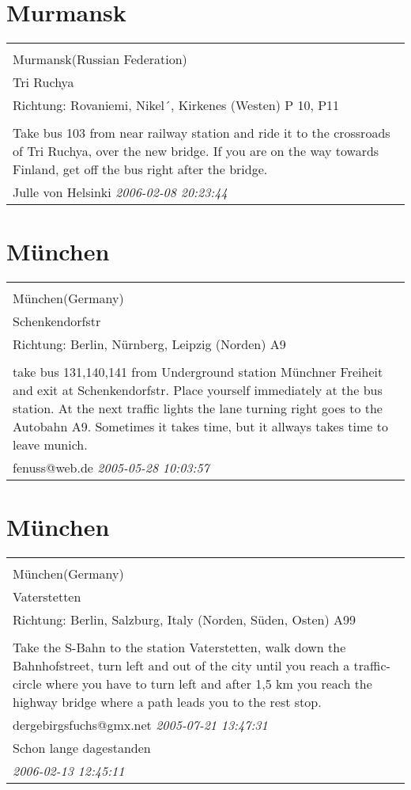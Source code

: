 \documentclass[a4paper,12pt]{article}
\begin{document}
\section{Murmansk}
\begin{tabular}{|p{13cm}|}
\hline\\
Murmansk(Russian Federation)\\
Tri Ruchya\\
Richtung: Rovaniemi, Nikel´, Kirkenes (Westen) P 10, P11 \\
\hline\\
Take bus 103 from near railway station and ride it to the crossroads of Tri Ruchya, over the new bridge. If you are on the way towards Finland, get off the bus right after the bridge. \\
Julle von Helsinki \textit{ 2006-02-08 20:23:44 }\\\hline
\end{tabular}


\section{München}
\begin{tabular}{|p{13cm}|}
\hline\\
München(Germany)\\
Schenkendorfstr\\
Richtung: Berlin, Nürnberg, Leipzig (Norden) A9 \\
\hline\\
take bus 131,140,141 from Underground station Münchner Freiheit and exit at Schenkendorfstr. Place yourself immediately at the bus station. At the next traffic lights the lane turning right goes to the Autobahn A9. Sometimes it takes time, but it allways takes time to leave munich. \\
fenuss@web.de \textit{ 2005-05-28 10:03:57 }\\\hline
\end{tabular}


\section{München}
\begin{tabular}{|p{13cm}|}
\hline\\
München(Germany)\\
Vaterstetten\\
Richtung: Berlin, Salzburg, Italy (Norden, Süden, Osten) A99 \\
\hline\\
Take the S-Bahn to the station Vaterstetten, walk down the Bahnhofstreet, turn left and out of the city until you reach a traffic-circle where you have to turn left and after 1,5 km you reach the highway bridge where a path leads you to the rest stop. \\
dergebirgsfuchs@gmx.net \textit{ 2005-07-21 13:47:31 }\\\hline Schon lange dagestanden \\
\textit{ 2006-02-13 12:45:11 }\\\hline
\end{tabular}
\end{document}
